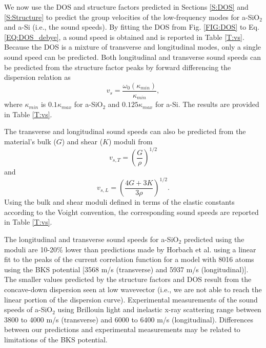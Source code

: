\documentclass[aps,prb,twocolumn,superscriptaddress,footinbib,amsmath,amssymb,floatfix]{revtex4}
\begin{document}
We now use the DOS and structure factors predicted in
Sections \ref{S:DOS} and \ref{S:Structure} to
predict the group velocities of the low-frequency modes for
a-SiO$_2$ and a-Si (i.e., the sound speeds). By fitting the DOS
from Fig. \ref{FIG:DOS} to Eq. \eqref{EQ:DOS_debye}, 
a sound speed is obtained and is 
reported in Table \ref{T:vs}. Because the DOS is a mixture of
transverse and longitudinal modes, only a single sound speed can be
predicted. 
Both longitudinal and transverse sound speeds can be predicted from
the structure factor peaks by forward differencing the dispersion relation as
\begin{equation}\label{EQ:vs_dwdk}
v_{s} = \frac{\omega_0(\kappa_{min})}{\kappa_{min}},
\end{equation}
where $\kappa_{min}$ is $0.1\kappa_{max}$ for a-SiO$_2$ and 
$0.125\kappa_{max}$ for a-Si. The results are provided in 
Table \ref{T:vs}.

The transverse and longitudinal sound speeds can
also be predicted from the material's bulk ($G$) and
shear ($K$) moduli from\cite{gale_general_2003} 
\begin{equation}\label{EQ:vs_T_elas}
v_{s,T} = \left(\frac{G}{\rho}\right)^{1/2}
\end{equation}
and
\begin{equation}\label{EQ:vs_L_elas}
v_{s,L} = \left(\frac{4G + 3K}{3\rho}\right)^{1/2}.
\end{equation}
Using the bulk and shear moduli defined in terms of the elastic
constants according to the Voight convention,\cite{gale_general_2003} 
the corresponding sound speeds are reported in Table \ref{T:vs}.
 
The longitudinal and transverse sound speeds for 
a-SiO$_2$ predicted using the moduli are 10-20\%  
lower than predictions made by Horbach et al. using a linear fit 
to the peaks of the 
current correlation function for a model with 
8016 atoms using the BKS potential 
[3568 m/s (transverse) and 5937 m/s (longitudinal)].
\cite{horbach_high_2001} The smaller 
values predicted by the structure factors and DOS 
result from the concave-down dispersion seen at low 
wavevector (i.e., we are not able to reach 
the linear portion of the dispersion curve). 
Experimental measurements of the sound speeds of a-SiO$_2$ 
using Brillouin light and inelastic x-ray 
scattering range between 3800 to 4000 m/s (transverse) and 
6000 to 6400 m/s (longitudinal).
\cite{ruocco_high-frequency_2001,polian_elastic_2002,
ruzicka_evidence_2004} Differences between our predictions and 
experimental measurements may be related to limitations of the 
BKS potential.
\end{document}
